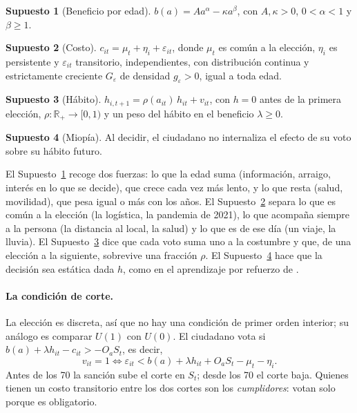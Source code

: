 \documentclass[11pt]{article}
\theoremstyle{definition}
\newtheorem{assumption}{Supuesto}
\newcommand{\1}{\mathbbm{1}}
\begin{document}
\begin{assumption}[Beneficio por edad]\label{as:benefit}
$b(a)=A a^{\alpha}-\kappa a^{\beta}$, con $A,\kappa>0$, $0<\alpha<1$ y $\beta\ge 1$.
\end{assumption}

\begin{assumption}[Costo]\label{as:cost}
$c_{it}=\mu_t+\eta_i+\varepsilon_{it}$, donde $\mu_t$ es común a la elección, $\eta_i$ es
persistente y $\varepsilon_{it}$ transitorio, independientes, con distribución continua y
estrictamente creciente $G_\varepsilon$ de densidad $g_\varepsilon>0$, igual a toda edad.
\end{assumption}

\begin{assumption}[Hábito]\label{as:habit}
$h_{i,t+1}=\rho(a_{it})\,h_{it}+v_{it}$, con $h=0$ antes de la primera elección,
$\rho:\mathbb{R}_+\to[0,1)$ y un peso del hábito en el beneficio $\lambda\ge0$.
\end{assumption}

\begin{assumption}[Miopía]\label{as:myopic}
Al decidir, el ciudadano no internaliza el efecto de su voto sobre su hábito futuro.
\end{assumption}

El Supuesto~\ref{as:benefit} recoge dos fuerzas: lo que la edad suma (información, arraigo, interés
en lo que se decide), que crece cada vez más lento, y lo que resta (salud, movilidad), que pesa
igual o más con los años. El Supuesto~\ref{as:cost} separa lo que es común a la elección (la
logística, la pandemia de 2021), lo que acompaña siempre a la persona (la distancia al local, la
salud) y lo que es de ese día (un viaje, la lluvia). El Supuesto~\ref{as:habit} dice que cada voto
suma uno a la costumbre y que, de una elección a la siguiente, sobrevive una fracción $\rho$. El
Supuesto~\ref{as:myopic} hace que la decisión sea estática dada $h$, como en el aprendizaje por
refuerzo de \citet{fowler2006}.

\paragraph{La condición de corte.} La elección es discreta, así que no hay una condición de primer
orden interior; su análogo es comparar $U(1)$ con $U(0)$. El ciudadano vota si
$b(a)+\lambda h_{it}-c_{it}>-O_aS_t$, es decir,
\begin{equation}\label{eq:cutoff}
  v_{it}=1 \iff \varepsilon_{it}<b(a)+\lambda h_{it}+O_aS_t-\mu_t-\eta_i .
\end{equation}
Antes de los 70 la sanción sube el corte en $S_t$; desde los 70 el corte baja. Quienes tienen un
costo transitorio entre los dos cortes son los \emph{cumplidores}: votan solo porque es obligatorio.
\end{document}
